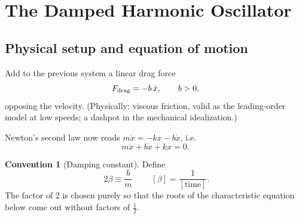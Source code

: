 \documentclass[11pt]{article}
\theoremstyle{plain}
\theoremstyle{definition}
\newtheorem{convention}[lemma]{Convention}
\theoremstyle{remark}
\begin{document}
\section{The Damped Harmonic Oscillator}
\label{sec:damped}

\subsection{Physical setup and equation of motion}

Add to the previous system a linear drag force
\begin{equation}
  F_{\rm drag} = -b\,\dot x, \qquad b > 0,
\end{equation}
opposing the velocity. (Physically: viscous friction, valid as the
leading-order model at low speeds; a dashpot in the mechanical idealization.)

\begin{center}
\end{center}

Newton's second law now reads $m\ddot x = -kx - b\dot x$, i.e.
\begin{equation}
  m \ddot x + b\dot x + k x = 0 .
\end{equation}

\begin{convention}[Damping constant]\label{conv:beta}
Define
\begin{equation}
  \boxed{\;2\beta \equiv \frac{b}{m}\;}
  \qquad [\beta] = \frac{1}{[\text{time}]} .
\end{equation}
The factor of $2$ is chosen purely so that the roots of the characteristic
equation below come out without factors of $\tfrac12$.
\end{convention}
\end{document}
